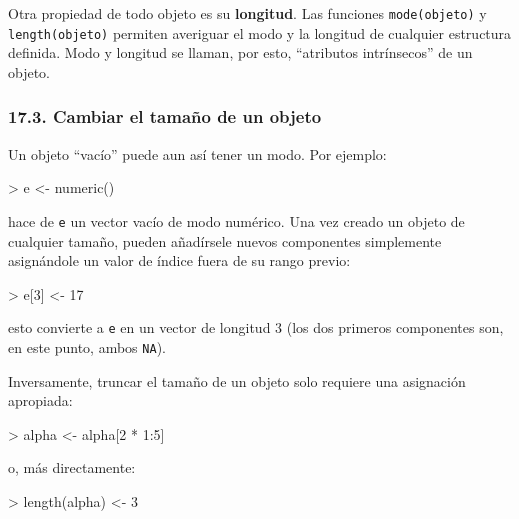\documentclass[
  jou,
  floatsintext,
  longtable,
  a4paper,
  nolmodern,
  notxfonts,
  notimes,
  12pt,
  colorlinks=true,linkcolor=blue,citecolor=blue,urlcolor=blue]{apa7}
\newenvironment{Shaded}{\begin{snugshade}}{\end{snugshade}}
\newcommand{\DecValTok}[1]{\textcolor[rgb]{0.68,0.00,0.00}{#1}}
\newcommand{\FunctionTok}[1]{\textcolor[rgb]{0.28,0.35,0.67}{#1}}
\newcommand{\NormalTok}[1]{\textcolor[rgb]{0.00,0.23,0.31}{#1}}
\newcommand{\OtherTok}[1]{\textcolor[rgb]{0.00,0.23,0.31}{#1}}
\newcommand{\SpecialCharTok}[1]{\textcolor[rgb]{0.37,0.37,0.37}{#1}}
\begin{document}
Otra propiedad de todo objeto es su \textbf{longitud}. Las funciones
\texttt{mode(objeto)} y \texttt{length(objeto)} permiten averiguar el
modo y la longitud de cualquier estructura definida. Modo y longitud se
llaman, por esto, ``atributos intrínsecos'' de un objeto.

\subsubsection{17.3. Cambiar el tamaño de un
objeto}\label{cambiar-el-tamauxf1o-de-un-objeto}

Un objeto ``vacío'' puede aun así tener un modo. Por ejemplo:

\begin{Shaded}
\begin{Highlighting}[]
\SpecialCharTok{\textgreater{}}\NormalTok{ e }\OtherTok{\textless{}{-}} \FunctionTok{numeric}\NormalTok{()}
\end{Highlighting}
\end{Shaded}

hace de \texttt{e} un vector vacío de modo numérico. Una vez creado un
objeto de cualquier tamaño, pueden añadírsele nuevos componentes
simplemente asignándole un valor de índice fuera de su rango previo:

\begin{Shaded}
\begin{Highlighting}[]
\SpecialCharTok{\textgreater{}}\NormalTok{ e[}\DecValTok{3}\NormalTok{] }\OtherTok{\textless{}{-}} \DecValTok{17}
\end{Highlighting}
\end{Shaded}

esto convierte a \texttt{e} en un vector de longitud 3 (los dos primeros
componentes son, en este punto, ambos \texttt{NA}).

Inversamente, truncar el tamaño de un objeto solo requiere una
asignación apropiada:

\begin{Shaded}
\begin{Highlighting}[]
\SpecialCharTok{\textgreater{}}\NormalTok{ alpha }\OtherTok{\textless{}{-}}\NormalTok{ alpha[}\DecValTok{2} \SpecialCharTok{*} \DecValTok{1}\SpecialCharTok{:}\DecValTok{5}\NormalTok{]}
\end{Highlighting}
\end{Shaded}

o, más directamente:

\begin{Shaded}
\begin{Highlighting}[]
\SpecialCharTok{\textgreater{}} \FunctionTok{length}\NormalTok{(alpha) }\OtherTok{\textless{}{-}} \DecValTok{3}
\end{Highlighting}
\end{Shaded}
\end{document}

